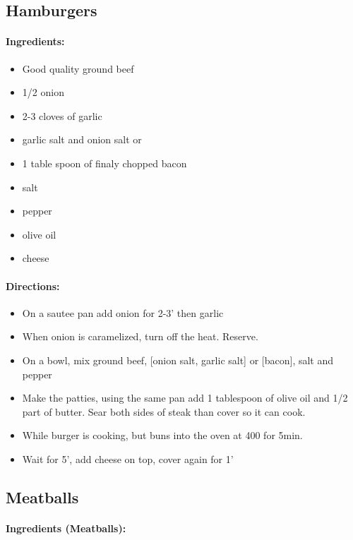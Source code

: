 \documentclass{article}
\begin{document}
\subsection{Hamburgers}

\paragraph{Ingredients:}

\begin{itemize}
	\item Good quality ground beef
	\item 1/2 onion
	\item 2-3 cloves of garlic
	\item garlic salt and onion salt or
	\item 1 table spoon of finaly chopped bacon
	\item salt
	\item pepper
	\item olive oil
	\item cheese
\end{itemize}

\paragraph{Directions:}
\begin{itemize}
	\item On a sautee pan add onion for 2-3' then garlic
	\item When onion is caramelized, turn off the heat. Reserve.
	\item On a bowl, mix ground beef, [onion salt, garlic salt] or [bacon], salt and pepper
	\item Make the patties, using the same pan add 1 tablespoon of olive oil and 1/2 part of butter. Sear both sides of steak than cover so it can cook.
	\item While burger is cooking, but buns into the oven at 400 for 5min.
	\item Wait for 5', add cheese on top, cover again for 1'
\end{itemize} 

\subsection{Meatballs}

\paragraph{Ingredients (Meatballs):}
\end{document}

